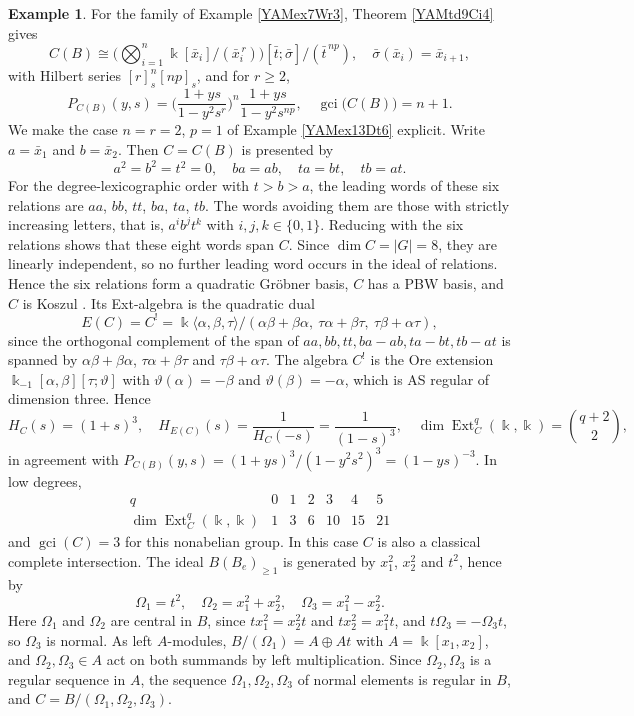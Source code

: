 \documentclass[reqno]{amsart}
\numberwithin{equation}{section}
\theoremstyle{definition}
\newtheorem{example}[equation]{Example}
\theoremstyle{remark}
\theoremstyle{plain}
\newcommand{\kk}{\Bbbk}
\DeclareMathOperator{\Ext}{Ext}
\DeclareMathOperator{\gci}{gci}
\begin{document}
\begin{example}\label{YAMex6Cd8}
For the family of Example \ref{YAMex7Wr3}, Theorem \ref{YAMtd9Ci4} gives
\[
C(B)\cong\Big(\bigotimes_{i=1}^n\kk[\bar x_i]/(\bar x_i^{\,r})\Big)[\bar t;\bar\sigma]/(\bar t^{\,np}),\quad\bar\sigma(\bar x_i)=\bar x_{i+1},
\]
with Hilbert series $[r]_s^n[np]_s$, and for $r\ge2$,
\[
P_{C(B)}(y,s)=\Big(\frac{1+ys}{1-y^2s^r}\Big)^n\frac{1+ys}{1-y^2s^{np}},\quad\gci\big(C(B)\big)=n+1.
\]
We make the case $n=r=2$, $p=1$ of Example \ref{YAMex13Dt6} explicit. Write $a=\bar x_1$ and $b=\bar x_2$. Then $C=C(B)$ is presented by
\[
a^2=b^2=t^2=0,\quad ba=ab,\quad ta=bt,\quad tb=at.
\]
For the degree-lexicographic order with $t>b>a$, the leading words of these six relations are $aa$, $bb$, $tt$, $ba$, $ta$, $tb$. The words avoiding them are those with strictly increasing letters, that is, $a^ib^jt^k$ with $i,j,k\in\{0,1\}$. Reducing with the six relations shows that these eight words span $C$. Since $\dim C=|G|=8$, they are linearly independent, so no further leading word occurs in the ideal of relations. Hence the six relations form a quadratic Gr\"obner basis, $C$ has a PBW basis, and $C$ is Koszul \cite[Theorem 5.3]{Pri}. Its Ext-algebra is the quadratic dual
\[
E(C)=C^!=\kk\langle\alpha,\beta,\tau\rangle/(\alpha\beta+\beta\alpha,\ \tau\alpha+\beta\tau,\ \tau\beta+\alpha\tau),
\]
since the orthogonal complement of the span of $aa,bb,tt,ba-ab,ta-bt,tb-at$ is spanned by $\alpha\beta+\beta\alpha$, $\tau\alpha+\beta\tau$ and $\tau\beta+\alpha\tau$. The algebra $C^!$ is the Ore extension $\kk_{-1}[\alpha,\beta][\tau;\vartheta]$ with $\vartheta(\alpha)=-\beta$ and $\vartheta(\beta)=-\alpha$, which is AS regular of dimension three. Hence
\[
H_C(s)=(1+s)^3,\quad H_{E(C)}(s)=\frac{1}{H_C(-s)}=\frac{1}{(1-s)^3},\quad\dim\Ext^q_C(\kk,\kk)=\binom{q+2}{2},
\]
in agreement with $P_{C(B)}(y,s)=(1+ys)^3/(1-y^2s^2)^3=(1-ys)^{-3}$. In low degrees,
\[
\begin{array}{c|cccccc}
q&0&1&2&3&4&5\\\hline
\dim\Ext^q_C(\kk,\kk)&1&3&6&10&15&21
\end{array}
\]
and $\gci(C)=3$ for this nonabelian group. In this case $C$ is also a classical complete intersection. The ideal $B(B_e)_{\ge1}$ is generated by $x_1^2$, $x_2^2$ and $t^2$, hence by
\[
\Omega_1=t^2,\quad\Omega_2=x_1^2+x_2^2,\quad\Omega_3=x_1^2-x_2^2.
\]
Here $\Omega_1$ and $\Omega_2$ are central in $B$, since $tx_1^2=x_2^2t$ and $tx_2^2=x_1^2t$, and $t\Omega_3=-\Omega_3t$, so $\Omega_3$ is normal. As left $A$-modules, $B/(\Omega_1)=A\oplus At$ with $A=\kk[x_1,x_2]$, and $\Omega_2,\Omega_3\in A$ act on both summands by left multiplication. Since $\Omega_2,\Omega_3$ is a regular sequence in $A$, the sequence $\Omega_1,\Omega_2,\Omega_3$ of normal elements is regular in $B$, and $C=B/(\Omega_1,\Omega_2,\Omega_3)$.
\end{example}
\end{document}
